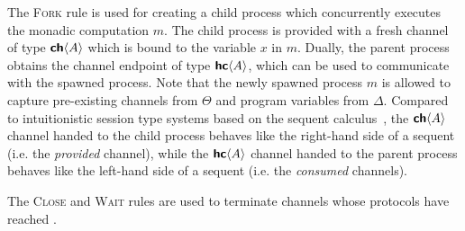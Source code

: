 The \textsc{Fork} rule is used for creating a child process which concurrently
executes the monadic computation $m$. The child process is provided with a fresh
channel of type ${\textbf{\textsf{ch}}\langle{A}\rangle}$ which is bound to the variable $x$ in $m$. Dually, the
parent process obtains the channel endpoint of type ${\textbf{\textsf{hc}}\langle{A}\rangle}$, which can be used
to communicate with the spawned process. Note that the newly spawned process $m$ 
is allowed to capture pre-existing channels from $\Theta$
and program variables from $\Delta$. Compared to intuitionistic session type
systems based on the sequent calculus~\cite{caires10,pfenning11,das20}, the ${\textbf{\textsf{ch}}\langle{A}\rangle}$
channel handed to the child process behaves like the right-hand side of a sequent
(i.e. the \emph{provided} channel), while the ${\textbf{\textsf{hc}}\langle{A}\rangle}$ channel handed
to the parent process behaves like the left-hand side of a sequent 
(i.e. the \emph{consumed} channels).

The \textsc{Close} and \textsc{Wait}
rules are used to terminate channels whose protocols have reached \End{}.
